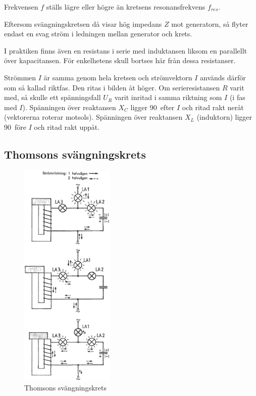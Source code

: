 Frekvensen \(f\) ställs lägre eller högre än kretsens resonansfrekvens
\(f_{res}\).

Eftersom svängningskretsen då visar hög impedans \(Z\) mot generatorn, så
flyter endast en svag ström i ledningen mellan generator och krets.

I praktiken finns även en resistans i serie med induktansen liksom en
parallellt över kapacitansen.
För enkelhetens skull bortses här från dessa resistanser.

Strömmen \(I\) är samma genom hela kretsen och strömvektorn \(I\) används
därför som så kallad riktfas.
Den ritas i bilden åt höger.
Om serieresistansen \(R\) varit med, så skulle ett spänningsfall \(U_R\) varit
inritad i samma riktning som \(I\) (i fas med \(I\)).
Spänningen över reaktansen \(X_C\) ligger 90\degree~efter \(I\) och ritad
rakt neråt (vektorerna roterar motsols).
Spänningen över reaktansen \(X_L\) (induktorn) ligger 90\degree~före \(I\) och
ritad rakt uppåt.

\subsection{Thomsons svängningskrets}

\begin{figure}[ht]
\begin{center}
  \includegraphics[width=0.4\textwidth]{images/cropped_pdfs/bild_2_3-17.pdf}
  \caption{Thomsons svängningskrets}
  \label{fig:BildII3-17}
\end{center}
\end{figure}

